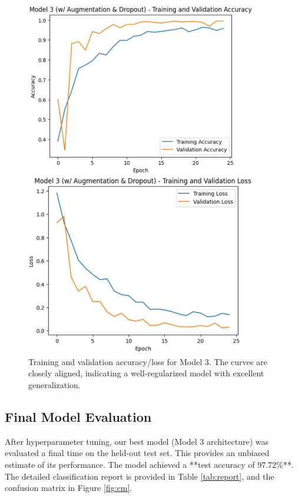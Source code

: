 \documentclass[pdflatex,sn-mathphys-num]{sn-jnl}%
\theoremstyle{thmstyleone}%
\theoremstyle{thmstyletwo}%
\theoremstyle{thmstylethree}%
\begin{document}
\begin{figure}[h]
\centering
\includegraphics[width=0.9\textwidth]{model3_curves.png}
\caption{Training and validation accuracy/loss for Model 3. The curves are closely aligned, indicating a well-regularized model with excellent generalization.}\label{fig:model3}
\end{figure}

\subsection{Final Model Evaluation}
After hyperparameter tuning, our best model (Model 3 architecture) was evaluated a final time on the held-out test set. This provides an unbiased estimate of its performance. The model achieved a **test accuracy of 97.72\%**. The detailed classification report is provided in Table \ref{tab:report}, and the confusion matrix in Figure \ref{fig:cm}.
\end{document}
